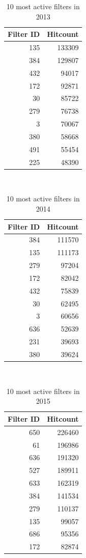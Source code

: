 \documentclass{sigchi}
\begin{document}
\begin{table}
  \centering
  \begin{tabular}{r r }
    Filter ID & Hitcount \\
    \hline
    135 & 133309 \\
    384 & 129807 \\
    432 & 94017 \\
    172 & 92871 \\
    30 & 85722 \\
    279 & 76738 \\
    3 & 70067 \\
    380 & 58668 \\
    491 & 55454 \\
    225 & 48390 \\
  \end{tabular}
  \caption{10 most active filters in 2013}~\label{tab:most-active-2013}
\end{table}

\begin{table}
  \centering
  \begin{tabular}{r r }
    Filter ID & Hitcount \\
    \hline
    384 & 111570 \\
    135 & 111173 \\
    279 & 97204 \\
    172 & 82042 \\
    432 & 75839 \\
    30 & 62495 \\
    3 & 60656 \\
    636 & 52639 \\
    231 & 39693 \\
    380 & 39624 \\
  \end{tabular}
  \caption{10 most active filters in 2014}~\label{tab:most-active-2014}
\end{table}

\begin{table}
  \centering
  \begin{tabular}{r r }
    Filter ID & Hitcount \\
    \hline
    650 & 226460 \\
    61 & 196986 \\
    636 & 191320 \\
    527 & 189911 \\
    633 & 162319 \\
    384 & 141534 \\
    279 & 110137 \\
    135 & 99057 \\
    686 & 95356 \\
    172 & 82874 \\
  \end{tabular}
  \caption{10 most active filters in 2015}~\label{tab:most-active-2015}
\end{table}
\end{document}
